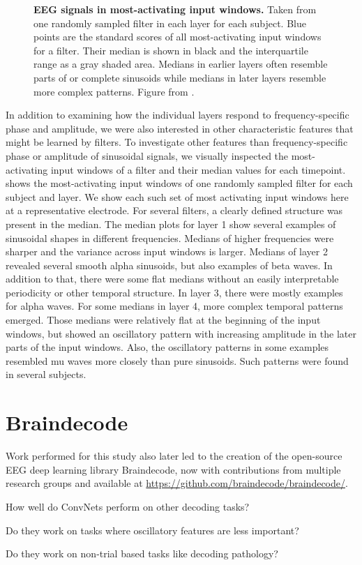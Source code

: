 \begin{figure}[h!tb]
    \caption[EEG signals in most-activating windows. per-electrode class prototypes]{
\textbf{EEG signals in most-activating input windows.} Taken from one randomly sampled filter in each layer for each subject. Blue points are the standard scores of all most-activating input windows for a filter. Their median is shown in black and the interquartile range as a gray shaded area. Medians in earlier layers often resemble parts of or complete sinusoids while medians in later layers resemble more complex
patterns. Figure from \citet{hartmann2018hierarchical}. 
    }\label{maximally-activating-units-fig}
\end{figure}



    In addition to examining how the individual layers respond to
frequency-specific phase and amplitude, we were also interested in other
characteristic features that might be learned by filters. To investigate
other features than frequency-specific phase or amplitude of sinusoidal
signals, we visually inspected the most-activating input windows of a
filter and their median values for each timepoint.
 shows the
most-activating input windows of one randomly sampled filter for each
subject and layer. We show each such set of most activating input
windows here at a representative electrode.
% 
For several filters, a clearly defined structure was present in the
median. The median plots for layer 1 show several examples of sinusoidal
shapes in different frequencies. Medians of higher frequencies were
sharper and the variance across input windows is larger. Medians of
layer 2 revealed several smooth alpha sinusoids, but also examples of
beta waves. In addition to that, there were some flat medians without an
easily interpretable periodicity or other temporal structure. In layer
3, there were mostly examples for alpha waves. For some medians in layer
4, more complex temporal patterns emerged. Those medians were relatively
flat at the beginning of the input windows, but showed an oscillatory
pattern with increasing amplitude in the later parts of the input
windows. Also, the oscillatory patterns in some examples resembled mu
waves more closely than pure sinusoids. Such patterns were found in
several subjects.

\section{Braindecode}\label{braindecode}

Work performed for this study also later led to the creation of the
open-source EEG deep learning library Braindecode, now with
contributions from multiple research groups and available at
\url{https://github.com/braindecode/braindecode/}.

\begin{openbox}
\item How well do ConvNets perform on other decoding tasks?
\item Do they work on tasks where oscillatory features are less important?
\item Do they work on non-trial based tasks like decoding pathology?
\end{openbox}
